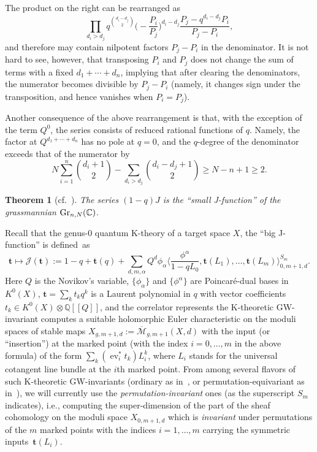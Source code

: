 \documentclass[10pt,a4paper]{amsart}
\numberwithin{equation}{section}
\newtheorem{Theorem}{Theorem}[section]
\def\J{\mathcal J}
\def\M{{\overline{\mathcal M}}}
\def\QQ{\mathbb Q}
\def\CC{\mathbb C}
\def\a{\alpha}
\def\t{{\mathbf t}}
\def\lan{\langle}
\def\ran{\rangle}
\def\ev{\operatorname{ev}}
\theoremstyle{definition}
\theoremstyle{plain}
\begin{document}
\begin{Remark}\label{rmk1}
The product on the right can be rearranged as
\[
\prod_{d_i>d_j} q^{\binom{d_i-d_j}{2}} \bigg(\!{-}\frac{P_i}{P_j}\bigg)^{d_i-d_j}\frac{P_j-q^{d_i-d_j}P_i}{P_j-P_i},
\]
and therefore may contain nilpotent factors $P_j-P_i$ in the denominator. It is not hard to see, however, that transposing $P_i$ and $P_j$ does not change the sum of terms with a fixed $d_1+\cdots +d_n$, implying that after clearing the denominators, the numerator becomes divisible by $P_j-P_i$ (namely, it changes sign under the transposition, and hence vanishes when $P_i=P_j$).
\end{Remark}

\begin{Remark}\label{rmk2}
Another consequence of the above rearrangement is that, with the exception of the term $Q^0$, the series consists of reduced rational functions of $q$. Namely, the factor at $Q^{d_1+\cdots+d_n}$ has no pole at $q=0$, and the $q$-degree of the denominator exceeds that of the numerator by
\[
N\sum_{i=1}^n\binom{d_i+1}{2}-\sum_{d_i>d_j}\binom{d_i-d_j+1}{2}\geq N-n+1\geq 2.
\]
\end{Remark}

\begin{Theorem}[{cf.~\cite{Taipale, Wen}}]\label{thm1}
The series $(1-q) J$ is the ``small J-function'' of the grassmannian ${\rm Gr}_{n,N}(\CC)$.
\end{Theorem}

Recall that the genus-0 quantum K-theory of a target space $X$, the ``big J-function'' is defi\-ned~as
\[
\t \mapsto \J(\t):=1-q+\t(q)+\sum_{d,m,\a} Q^d \phi_\a \bigg\lan \frac{\phi^\a}{1-qL_0},\t(L_1),\dots,\t(L_m)\bigg\ran_{0,m+1,d}^{S_m}.
\]
Here $Q$ is the Novikov's variable, $\{ \phi_\a \}$ and $\{ \phi^\a\}$ are Poincar{\'e}-dual bases in $K^0(X)$, $\t=\sum_k t_k q^k$ is a Laurent polynomial in $q$ with vector coefficients $t_k \in K^0(X)\otimes \QQ[[Q]]$, and the correlator represents the K-theoretic GW-invariant computes a suitable holomorphic Euler characteristic on the moduli spaces of stable maps $X_{g,m+1,d}:=\M_{g,m+1}(X,d)$ with the input (or ``insertion'') at the marked point (with the index $i=0,\dots,m$ in the above formula) of the form $\sum_k (\ev_i^*t_k) L_i^k$, where $L_i$ stands for the universal cotangent line bundle at the $i$th marked point. From among several flavors of such K-theoretic GW-invariants (ordinary as in~\cite{Givental-Tonita}, or permutation-equivariant as in~\cite{Givental:perm9}), we will currently use the {\em permutation-invariant} ones (as the superscript $S_m$ indicates), i.e., computing the super-dimension of the part of the sheaf cohomology on the moduli space $X_{0,m+1,d}$ which is {\em invariant} under permutations of the $m$ marked points with the indices $i=1,\dots,m$ carrying the symmetric inputs~$\t(L_i)$.
\end{document}
